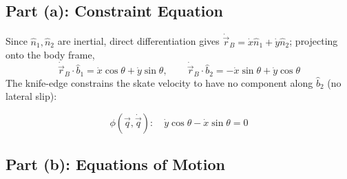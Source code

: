 \documentclass[11pt]{article}
\begin{document}
\subsection*{Part (a): Constraint Equation}

Since $\hat n_1,\hat n_2$ are inertial, direct differentiation gives $\dot{\vec r}_B=\dot x\hat n_1+\dot y\hat n_2$; projecting onto the body frame,
\[
    \dot{\vec r}_B\cdot\hat b_1 = \dot x\cos\theta+\dot y\sin\theta,
    \qquad
    \dot{\vec r}_B\cdot\hat b_2 = -\dot x\sin\theta+\dot y\cos\theta
\]
The knife-edge constrains the skate velocity to have no component along $\hat b_2$ (no lateral slip):
\begin{result}
\[
    \phi(\vec q,\dot{\vec q}):\quad \dot y\cos\theta - \dot x\sin\theta = 0
\]
\end{result}

\subsection*{Part (b): Equations of Motion}
\end{document}
